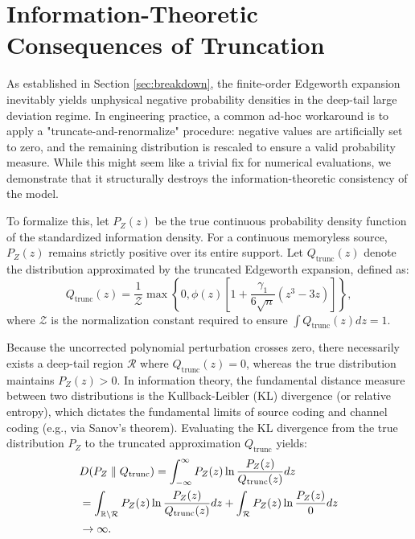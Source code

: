 \documentclass[conference]{IEEEtran}
\begin{document}
\section{Information-Theoretic Consequences of Truncation}
\label{sec:kl_divergence}

As established in Section \ref{sec:breakdown}, the finite-order Edgeworth expansion inevitably yields unphysical negative probability densities in the deep-tail large deviation regime. In engineering practice, a common ad-hoc workaround is to apply a "truncate-and-renormalize" procedure: negative values are artificially set to zero, and the remaining distribution is rescaled to ensure a valid probability measure. While this might seem like a trivial fix for numerical evaluations, we demonstrate that it structurally destroys the information-theoretic consistency of the model.

To formalize this, let $P_Z(z)$ be the true continuous probability density function of the standardized information density. For a continuous memoryless source, $P_Z(z)$ remains strictly positive over its entire support. Let $Q_{\text{trunc}}(z)$ denote the distribution approximated by the truncated Edgeworth expansion, defined as:
\begin{equation}
    Q_{\text{trunc}}(z) = \frac{1}{\mathcal{Z}} \max\left\{0, \phi(z) \left[ 1 + \frac{\gamma_1}{6\sqrt{n}} (z^3 - 3z) \right] \right\},
\end{equation}
where $\mathcal{Z}$ is the normalization constant required to ensure $\int Q_{\text{trunc}}(z)dz = 1$.

Because the uncorrected polynomial perturbation crosses zero, there necessarily exists a deep-tail region $\mathcal{R}$ where $Q_{\text{trunc}}(z) = 0$, whereas the true distribution maintains $P_Z(z) > 0$. In information theory, the fundamental distance measure between two distributions is the Kullback-Leibler (KL) divergence (or relative entropy), which dictates the fundamental limits of source coding and channel coding (e.g., via Sanov's theorem). Evaluating the KL divergence from the true distribution $P_Z$ to the truncated approximation $Q_{\text{trunc}}$ yields:
\begin{align}
    &D(P_Z \parallel Q_{\text{trunc}}) = \int_{-\infty}^{\infty} P_Z(z) \ln \frac{P_Z(z)}{Q_{\text{trunc}}(z)} dz \notag \\
    &= \int_{\mathbb{R} \setminus \mathcal{R}} P_Z(z) \ln \frac{P_Z(z)}{Q_{\text{trunc}}(z)} dz + \int_{\mathcal{R}} P_Z(z) \ln \frac{P_Z(z)}{0} dz \notag \\
    &\to \infty.
    \label{eq:kl_divergence_infinity}
\end{align}
\end{document}

